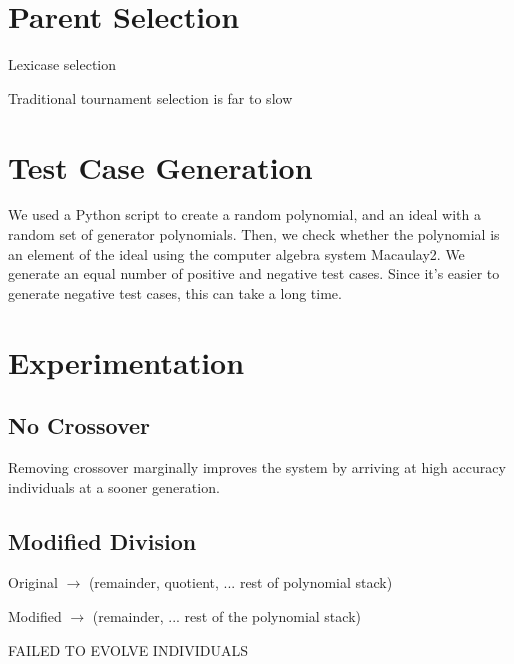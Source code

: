 \documentclass[20pt]{extarticle}
\begin{document}
\newpage
\section*{Parent Selection}

Lexicase selection

Traditional tournament selection is far to slow


\newpage
\section*{Test Case Generation}

We used a Python script to create a random polynomial, and an ideal with a random set of generator polynomials.
Then, we check whether the polynomial is an element of the ideal using the computer algebra system Macaulay2.
We generate an equal number of positive and negative test cases.
Since it's easier to generate negative test cases, this can take a long time.

\newpage
\section*{Experimentation}
\subsection*{No Crossover}

Removing crossover marginally improves the system by arriving at high accuracy individuals at a sooner generation.

\subsection*{Modified Division}

\noindent Original $\rightarrow$ (remainder, quotient, ... rest of polynomial stack)

\noindent Modified $\rightarrow$ (remainder, ... rest of the polynomial stack)

\noindent FAILED TO EVOLVE INDIVIDUALS
\end{document}
